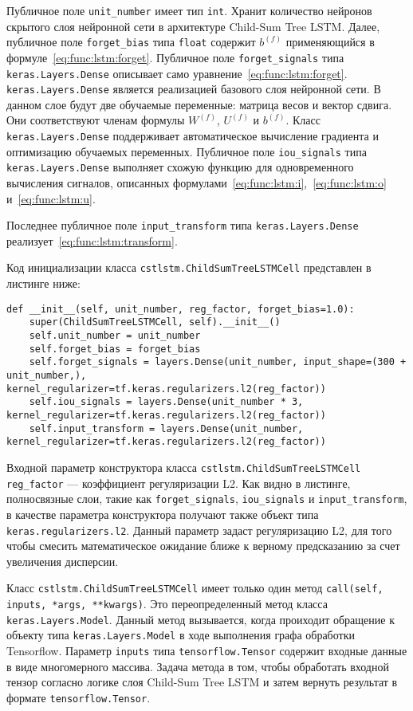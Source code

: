 Публичное поле \texttt{unit\_number} имеет тип \texttt{int}. Хранит количество нейронов скрытого слоя нейронной сети в архитектуре Child-Sum Tree LSTM\@. Далее, публичное поле \texttt{forget\_bias} типа \texttt{float} содержит $b^{(f)}$ применяющийся в формуле~\ref{eq:func:lstm:forget}. Публичное поле \texttt{forget\_signals} типа \texttt{keras.Layers.Dense} описывает само уравнение~\ref{eq:func:lstm:forget}. \texttt{keras.Layers.Dense} является реализацией базового слоя нейронной сети. В данном слое будут две обучаемые переменные: матрица весов и вектор сдвига. Они соответствуют членам формулы $W^{(f)}$, $U^{(f)}$ и $b^{(f)}$. Класс \texttt{keras.Layers.Dense} поддерживает автоматическое вычисление градиента и оптимизацию обучаемых переменных. Публичное поле \texttt{iou\_signals} типа \texttt{keras.Layers.Dense} выполняет схожую функцию для одновременного вычисления сигналов, описанных формулами~\ref{eq:func:lstm:i},~\ref{eq:func:lstm:o} и~\ref{eq:func:lstm:u}.

Последнее публичное поле \texttt{input\_transform} типа \texttt{keras.Layers.Dense} реализует~\ref{eq:func:lstm:transform}.

Код инициализации класса \texttt{cstlstm.ChildSumTreeLSTMCell} представлен в листинге ниже:

\medskip
\begin{lstlisting}[style=Python]
  def __init__(self, unit_number, reg_factor, forget_bias=1.0):
    super(ChildSumTreeLSTMCell, self).__init__()
    self.unit_number = unit_number
    self.forget_bias = forget_bias
    self.forget_signals = layers.Dense(unit_number, input_shape=(300 + unit_number,), kernel_regularizer=tf.keras.regularizers.l2(reg_factor))
    self.iou_signals = layers.Dense(unit_number * 3, kernel_regularizer=tf.keras.regularizers.l2(reg_factor))
    self.input_transform = layers.Dense(unit_number, kernel_regularizer=tf.keras.regularizers.l2(reg_factor))
\end{lstlisting}
\medskip

Входной параметр конструктора класса \texttt{cstlstm.ChildSumTreeLSTMCell} \texttt{reg\_factor} --- коэффициент регуляризации L2. Как видно в листинге, полносвязные слои, такие как \texttt{forget\_signals}, \texttt{iou\_signals} и \texttt{input\_transform}, в качестве параметра конструктора получают также объект типа \texttt{keras.regularizers.l2}. Данный параметр задаст регуляризацию L2, для того чтобы смесить математическое ожидание ближе к верному предсказанию за счет увеличения дисперсии.

Класс \texttt{cstlstm.ChildSumTreeLSTMCell} имеет только один метод \texttt{call(self, inputs, *args, **kwargs)}. Это переопределенный метод класса \texttt{keras.Layers.Model}. Данный метод вызывается, когда проиходит обращение к объекту типа \texttt{keras.Layers.Model} в ходе выполнения графа обработки Tensorflow. Параметр \texttt{inputs} типа \texttt{tensorflow.Tensor} содержит входные данные в виде многомерного массива. Задача метода в том, чтобы обработать входной тензор согласно логике слоя Child-Sum Tree LSTM и затем вернуть результат в формате \texttt{tensorflow.Tensor}.

